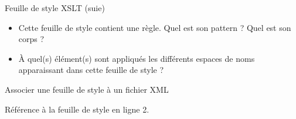 \begin{frame}[allowframebreaks]{Feuille de style XSLT (suie)}
\framebreak

\begin{center}
\begin{minipage}{0.7\textwidth}

\end{minipage}
\end{center}

\begin{exoblock}
\begin{itemize}
\item Cette feuille de style contient une règle. Quel est son pattern ? Quel est son corps ?
\item \`A quel(s) \'el\'ement(s) sont appliqu\'es les différents espaces de noms apparaissant dans cette feuille de style ?
\end{itemize}
\end{exoblock}

\end{frame}


\begin{frame}[allowframebreaks]{Associer une feuille de style \`a un fichier XML}

\begin{center}
\begin{minipage}{0.7\textwidth}

\end{minipage}
\end{center}

R\'ef\'erence \`a la feuille de style en ligne 2.

\end{frame}

